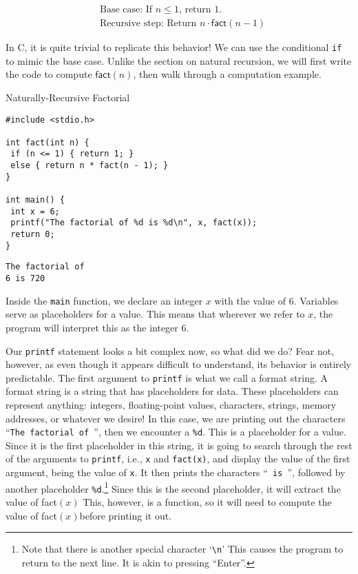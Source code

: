 \begin{align*}
    &\text{Base case: If }n\leq{1}\text{, return }1.\\
    &\text{Recursive step: Return }n \cdot \textsf{fact}(n-1)
\end{align*}

In C, it is quite trivial to replicate this behavior! We can use the conditional \texttt{if} to mimic the base case. Unlike the section on natural recursion, we will first write the code to compute $\textsf{fact}(n)$, then walk through a computation example.

\begin{clo}[main.c]{Naturally-Recursive Factorial}
\begin{lstlisting}[language=MyC]
#include <stdio.h>

int fact(int n) {
 if (n <= 1) { return 1; }
 else { return n * fact(n - 1); }
}

int main() {
 int x = 6;
 printf("The factorial of %d is %d\n", x, fact(x));
 return 0;
}
\end{lstlisting}
\tcblower
\begin{lstlisting}[language=MyOutput]
The factorial of 
6 is 720
\end{lstlisting}
\end{clo}

Inside the \texttt{main} function, we declare an integer $x$ with the value of $6$. Variables serve as placeholders for a value. This means that wherever we refer to $x$, the program will interpret this as the integer $6$.

Our \texttt{printf} statement looks a bit complex now, so what did we do? Fear not, however, as even though it appears difficult to understand, its behavior is entirely predictable. The first argument to \texttt{printf} is what we call a format string. A format string is a string that has placeholders for data. These placeholders can represent anything: integers, floating-point values, characters, strings, memory addresses, or whatever we desire! In this case, we are printing out the characters ``\texttt{The factorial of }'', then we encounter a \texttt{\%d}. This is a placeholder for a value. Since it is the first placeholder in this string, it is going to search through the rest of the arguments to \texttt{printf}, i.e., \texttt{x} and \texttt{fact(x)}, and display the value of the first argument, being the value of \texttt{x}. It then prints the characters ``\texttt{ is }'', followed by another placeholder \texttt{\%d}.\footnote{Note that there is another special character `\texttt{\textbackslash{n}}' This causes the program to return to the next line. It is akin to pressing ``Enter''.} Since this is the second placeholder, it will extract the value of \textsf{fact}$(x)$ This, however, is a function, so it will need to compute the value of \textsf{fact}$(x)$before printing it out.

